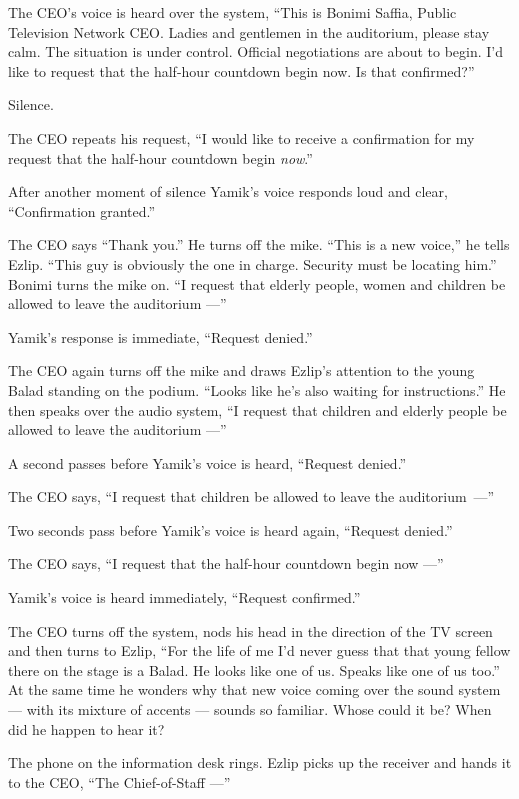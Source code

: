 \documentclass[twoside,11pt,openany]{book}
\begin{document}
The CEO's voice is heard over the system, ``This is Bonimi Saffia, Public Television Network CEO. Ladies
and gentlemen in the auditorium, please stay calm. The situation is under control. Official negotiations are about
to begin. I'd like to request that the
half-hour countdown begin now. Is that confirmed?''

Silence.

The CEO repeats his request, ``I would like to receive a confirmation for my request that the half-hour
countdown begin \textit{now}.''

After another moment of silence Yamik's voice responds loud and clear, ``Confirmation
granted.''

The CEO says ``Thank you.'' He turns off the mike. ``This is a new voice,'' he
tells Ezlip. ``This guy is{ }obviously the one in charge. Security must
be{ }locating him.'' Bonimi turns the mike on. ``I request that elderly
people, women and children be allowed to leave the auditorium ---''

Yamik's response is immediate, ``Request denied.''

The CEO again turns off the mike and draws Ezlip's attention to the young Balad standing on the podium. ``Looks like
he's also waiting for instructions.'' He then speaks over the audio system, ``I request that
children and elderly people be allowed to leave the auditorium ---''

A second passes before Yamik's voice is heard, ``Request denied.''

The CEO says, ``I request that children be allowed to leave the auditorium~---''

Two seconds pass before Yamik's voice is heard again, ``Request denied.''

The CEO says, ``I request that the half-hour countdown begin now ---''

Yamik's voice is heard immediately, ``Request confirmed.''

The CEO turns off the system, nods his head in the direction of the TV screen and then turns
to Ezlip, ``For the life of me I'd never guess that that young
fellow there on the stage is a Balad. He looks like one of us. Speaks like one of us too.'' At the
same time he wonders why that new voice coming over the sound system --- with its mixture of accents --- sounds so
familiar. Whose could it be? When did he happen to hear it?

The phone on the information desk rings.  Ezlip picks up the receiver and hands it to the CEO, ``The
Chief-of-Staff ---''
\end{document}

